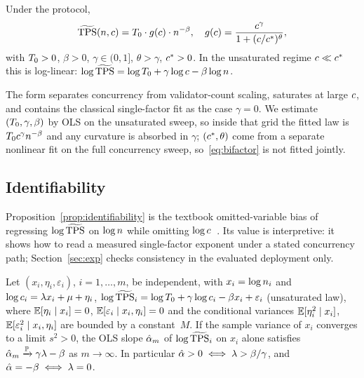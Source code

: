 \begin{Def}
\label{def:bifactor}
Under the \RNM{} protocol,
\begin{equation}
\TPSn(\n,\cc)=\Tzero\cdot\gfun(\cc)\cdot\n^{-\beta},
\quad
\gfun(\cc)=\frac{\cc^{\gamma}}{1+(\cc/\csat)^{\theta}},
\label{eq:bifactor}
\end{equation}
with $T_{0}>0$, $\beta>0$, $\gamma\in(0,1]$, $\theta>\gamma$, $c^{\ast}>0$.
In the unsaturated regime $c\ll c^{\ast}$ this is log-linear:
$\log\widetilde{\mathrm{TPS}}=\log T_{0}+\gamma\log c-\beta\log n$.
\end{Def}

The form separates concurrency from validator-count scaling, saturates at large
$c$, and contains the classical single-factor fit as the case $\gamma=0$.
We estimate $(T_{0},\gamma,\beta)$ by OLS on the unsaturated sweep, so inside
that grid the fitted law is $T_{0}c^{\gamma}n^{-\beta}$ and any curvature is
absorbed in $\gamma$; $(c^{\ast},\theta)$ come from a separate nonlinear fit on the
full concurrency sweep, so~\eqref{eq:bifactor} is not fitted jointly.

\subsection{Identifiability}

Proposition~\ref{prop:identifiability} is the textbook \mbox{omitted-variable}
bias of regressing $\log\widetilde{\mathrm{TPS}}$ on $\log n$ while omitting
$\log c$~\cite{wooldridge2010}. Its value is interpretive: it shows how to read
a measured single-factor exponent under a stated concurrency path;
Section~\ref{sec:exp} checks consistency in the evaluated deployment only.

\begin{Proposition}
\label{prop:identifiability}
Let $(x_{i},\eta_{i},\varepsilon_{i})$, $i=1,\dots,m$, be independent, with
$x_{i}=\log n_{i}$ and
$\log c_{i}=\lambda x_{i}+\mu+\eta_{i}$,
$\log\widetilde{\mathrm{TPS}}_{i}=\log T_{0}+\gamma\log c_{i}-\beta x_{i}+\varepsilon_{i}$
(unsaturated law), where $\mathbb{E}[\eta_{i}\mid x_{i}]=0$,
$\mathbb{E}[\varepsilon_{i}\mid x_{i},\eta_{i}]=0$ and the conditional variances
$\mathbb{E}[\eta_{i}^{2}\mid x_{i}]$, $\mathbb{E}[\varepsilon_{i}^{2}\mid x_{i},\eta_{i}]$ are
bounded by a constant~$M$. If the sample variance of $x_{i}$
converges to a limit $s^{2}>0$, the OLS slope $\hat{\alpha}_{m}$ of
$\log\widetilde{\mathrm{TPS}}_{i}$ on $x_{i}$ alone satisfies
$\hat{\alpha}_{m}\xrightarrow{\mathbb{P}}\gamma\lambda-\beta$ as $m\to\infty$.
In particular $\hat{\alpha}>0\iff\lambda>\beta/\gamma$, and $\hat{\alpha}=-\beta\iff\lambda=0$.
\end{Proposition}

